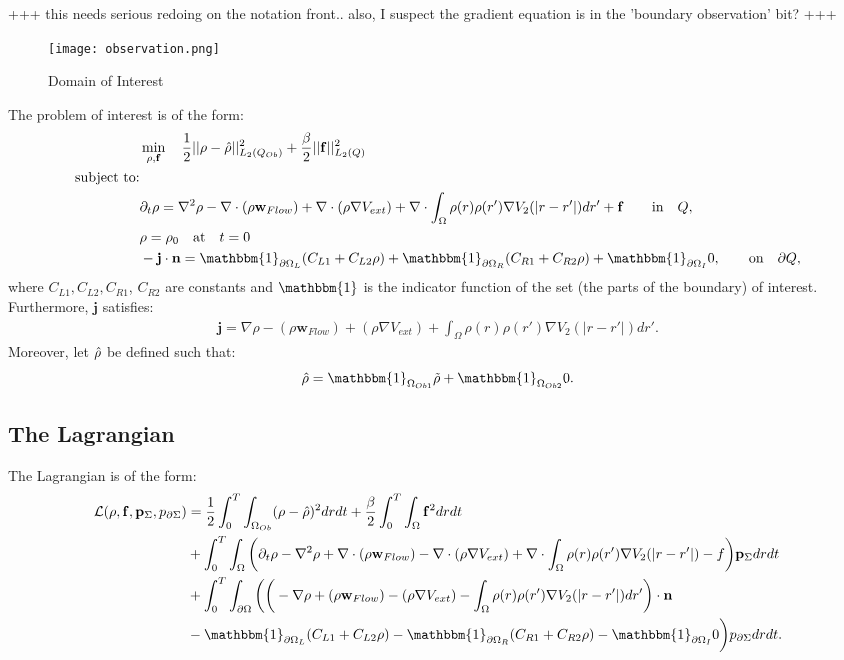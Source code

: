 +++ this needs serious redoing on the notation front.. also, I suspect the gradient equation is in the 'boundary observation' bit? +++

\begin{figure}[h]
	\texttt{[image: observation.png]}
	\caption{Domain of Interest}
	\label{Observation1}
\end{figure}

The problem of interest is of the form:
\begin{align*}
&\min_{\Sta, \Con} \quad \frac{1}{2}|| \Sta -\hat \Sta||^2_{L_2( Q_{Ob})} + \frac{\beta}{2}|| \Con||^2_{L_2(Q)}\\
\text{subject to:}\\
&\partial_t \rho = \nabla^2 \rho - \nabla \cdot (\rho \mathbf{w}_{Flow}) +\nabla \cdot (\rho \nabla V_{ext}) + \nabla \cdot \int_\Omega \rho(r) \rho(r') \nabla V_2(|r-r'|) dr' + \Con \quad  \quad\text{in} \quad Q,\notag\\
& \rho = \rho_0 \quad \text{at} \quad t=0 \notag\\
& - \mathbf{j} \cdot \nor = \mathbbm{1}_{\partial \Omega_L}( C_{L1}  + C_{L2}\Sta) +\mathbbm{1}_{\partial \Omega_R} ( C_{R1}  + C_{R2}\Sta) +\mathbbm{1}_{\partial \Omega_I} 0, \quad  \quad\text{on} \quad \partial Q, 
\end{align*}
where $C_{L1}, C_{L2}, C_{R1}$, $C_{R2}$ are constants and $\mathbbm{1}$ is the indicator function of the set (the parts of the boundary) of interest.
Furthermore, $\mathbf{j}$ satisfies:
\begin{align*}
\mathbf{j}=\nabla \rho - (\rho \mathbf{w}_{Flow}) +(\rho \nabla V_{ext}) +  \int_\Omega \rho(r) \rho(r') \nabla V_2(|r-r'|) dr'.
\end{align*}
Moreover, let $\hat {\rho}$ be defined such that:
\begin{align*}
\hat \Sta = \mathbbm{1}_{ \Omega_{Ob1}} \tilde \Sta  +\mathbbm{1}_{ \Omega_{Ob2}} 0.
\end{align*}

\subsection*{The Lagrangian}
The Lagrangian is of the form:
\begin{align*}
\mathcal{L}(\Sta,\Con,\Adja,\Adjc ) &=\frac{1}{2} \int_0^T \int_{\Omega_{Ob}} (\Sta - \hat \Sta)^2 dr dt + \frac{\beta}{2}\int_0^T \int_\Omega \Con^2 drdt \\
&+ \int_0^T \int_\Omega \bigg( \partial_t \rho - \nabla^2 \rho + \nabla \cdot (\rho \mathbf{w}_{Flow}) -\nabla \cdot (\rho \nabla V_{ext}) + \nabla \cdot \int_\Omega \rho(r) \rho(r') \nabla V_2(|r-r'|) -f \bigg) \Adja dr dt\\
&+ \int_0^T \int_{\partial \Omega} \bigg(  \bigg(-\nabla \rho+ (\rho \mathbf{w}_{Flow}) -(\rho \nabla V_{ext}) -  \int_\Omega \rho(r) \rho(r') \nabla V_2(|r-r'|) dr' \bigg)\cdot \nor\\
&  -\mathbbm{1}_{\partial \Omega_L}( C_{L1}  + C_{L2}\Sta) -\mathbbm{1}_{\partial \Omega_R} ( C_{R1}  + C_{R2}\Sta) -\mathbbm{1}_{\partial \Omega_I} 0 \bigg) \Adjc dr dt.
\end{align*}

